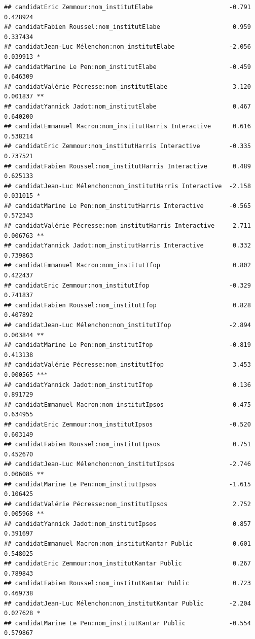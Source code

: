 \documentclass[
]{book}
\begin{document}
\begin{verbatim}
## candidatEric Zemmour:nom_institutElabe                     -0.791 0.428924    
## candidatFabien Roussel:nom_institutElabe                    0.959 0.337434    
## candidatJean-Luc Mélenchon:nom_institutElabe               -2.056 0.039913 *  
## candidatMarine Le Pen:nom_institutElabe                    -0.459 0.646309    
## candidatValérie Pécresse:nom_institutElabe                  3.120 0.001837 ** 
## candidatYannick Jadot:nom_institutElabe                     0.467 0.640200    
## candidatEmmanuel Macron:nom_institutHarris Interactive      0.616 0.538214    
## candidatEric Zemmour:nom_institutHarris Interactive        -0.335 0.737521    
## candidatFabien Roussel:nom_institutHarris Interactive       0.489 0.625133    
## candidatJean-Luc Mélenchon:nom_institutHarris Interactive  -2.158 0.031015 *  
## candidatMarine Le Pen:nom_institutHarris Interactive       -0.565 0.572343    
## candidatValérie Pécresse:nom_institutHarris Interactive     2.711 0.006763 ** 
## candidatYannick Jadot:nom_institutHarris Interactive        0.332 0.739863    
## candidatEmmanuel Macron:nom_institutIfop                    0.802 0.422437    
## candidatEric Zemmour:nom_institutIfop                      -0.329 0.741837    
## candidatFabien Roussel:nom_institutIfop                     0.828 0.407892    
## candidatJean-Luc Mélenchon:nom_institutIfop                -2.894 0.003844 ** 
## candidatMarine Le Pen:nom_institutIfop                     -0.819 0.413138    
## candidatValérie Pécresse:nom_institutIfop                   3.453 0.000565 ***
## candidatYannick Jadot:nom_institutIfop                      0.136 0.891729    
## candidatEmmanuel Macron:nom_institutIpsos                   0.475 0.634955    
## candidatEric Zemmour:nom_institutIpsos                     -0.520 0.603149    
## candidatFabien Roussel:nom_institutIpsos                    0.751 0.452670    
## candidatJean-Luc Mélenchon:nom_institutIpsos               -2.746 0.006085 ** 
## candidatMarine Le Pen:nom_institutIpsos                    -1.615 0.106425    
## candidatValérie Pécresse:nom_institutIpsos                  2.752 0.005968 ** 
## candidatYannick Jadot:nom_institutIpsos                     0.857 0.391697    
## candidatEmmanuel Macron:nom_institutKantar Public           0.601 0.548025    
## candidatEric Zemmour:nom_institutKantar Public              0.267 0.789843    
## candidatFabien Roussel:nom_institutKantar Public            0.723 0.469738    
## candidatJean-Luc Mélenchon:nom_institutKantar Public       -2.204 0.027628 *  
## candidatMarine Le Pen:nom_institutKantar Public            -0.554 0.579867    

\end{verbatim}
\end{document}
